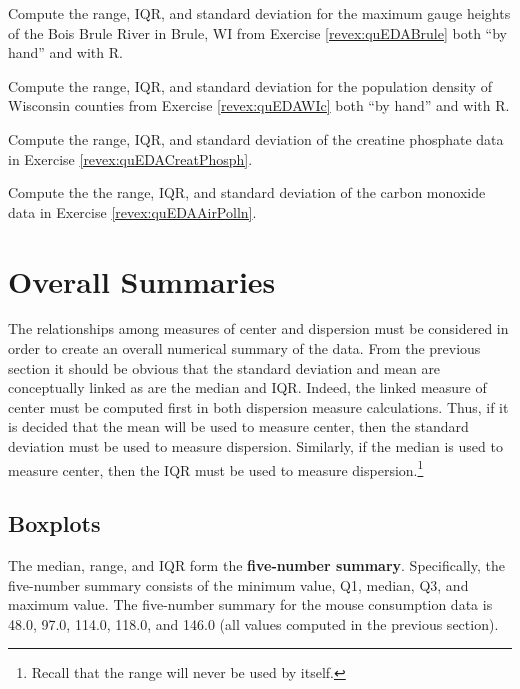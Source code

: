 \documentclass[10pt,openany]{book}\usepackage[]{graphicx}\usepackage[]{color}
\begin{document}
\begin{exsection}
  \item \label{revex:quEDABruleDisp} \rhw{} Compute the range, IQR, and standard deviation for the maximum gauge heights of the Bois Brule River in Brule, WI from Exercise \ref{revex:quEDABrule} both ``by hand'' and with R. 

  \item \label{revex:quEDAWIDisp} \rhw{} Compute the range, IQR, and standard deviation for the population density of Wisconsin counties from Exercise \ref{revex:quEDAWIc} both ``by hand'' and with R. 

  \item \label{revex:quEDACreatPhosph3} \rhw{} Compute the range, IQR, and standard deviation of the creatine phosphate data in Exercise \ref{revex:quEDACreatPhosph}. 

  \item \label{revex:quEDAAirPolln3} \rhw{} \hspace{12pt} Compute the the range, IQR, and standard deviation of the carbon monoxide data in Exercise \ref{revex:quEDAAirPolln}. 
\end{exsection}


\section{Overall Summaries}
The relationships among measures of center and dispersion must be considered in order to create an overall numerical summary of the data.  From the previous section it should be obvious that the standard deviation and mean are conceptually linked as are the median and IQR.  Indeed, the linked measure of center must be computed first in both dispersion measure calculations.  Thus, if it is decided that the mean will be used to measure center, then the standard deviation must be used to measure dispersion.  Similarly, if the median is used to measure center, then the IQR must be used to measure dispersion.\footnote{Recall that the range will never be used by itself.}


\subsection{Boxplots}
The median, range, and IQR form the \textbf{five-number summary}.  Specifically, the five-number summary consists of the minimum value, Q1, median, Q3, and maximum value.  The five-number summary for the mouse consumption data is 48.0, 97.0, 114.0, 118.0, and 146.0 (all values computed in the previous section).
\end{document}

